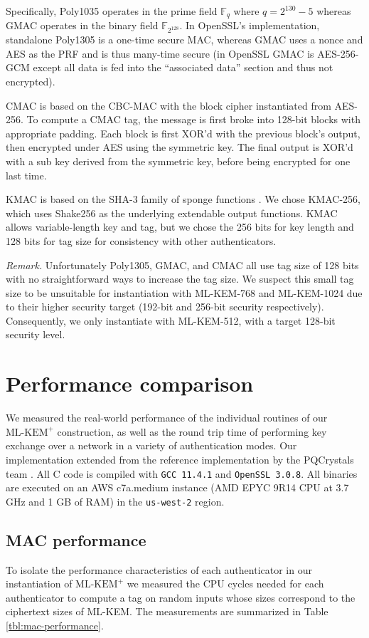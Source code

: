 \documentclass[journal=tches,submission]{iacrtrans}
\def\mlkemplus{\text{ML-KEM}^+}
\begin{document}
Specifically, Poly1035 operates in the prime field $\mathbb{F}_q$ where $q = 2^{130} - 5$ whereas GMAC operates in the binary field $\mathbb{F}_{2^{128}}$. In OpenSSL's implementation, standalone Poly1305 is a one-time secure MAC, whereas GMAC uses a nonce and AES as the PRF and is thus many-time secure (in OpenSSL GMAC is AES-256-GCM except all data is fed into the ``associated data'' section and thus not encrypted).

CMAC is based on the CBC-MAC with the block cipher instantiated from AES-256. To compute a CMAC tag, the message is first broke into 128-bit blocks with appropriate padding. Each block is first XOR'd with the previous block's output, then encrypted under AES using the symmetric key. The final output is XOR'd with a sub key derived from the symmetric key, before being encrypted for one last time.

KMAC is based on the SHA-3 family of sponge functions \cite{FIPS202}. We chose KMAC-256, which uses Shake256 as the underlying extendable output functions. KMAC allows variable-length key and tag, but we chose the 256 bits for key length and 128 bits for tag size for consistency with other authenticators.

\emph{Remark.} Unfortunately Poly1305, GMAC, and CMAC all use tag size of 128 bits with no straightforward ways to increase the tag size. We suspect this small tag size to be unsuitable for instantiation with ML-KEM-768 and ML-KEM-1024 due to their higher security target (192-bit and 256-bit security respectively). Consequently, we only instantiate with ML-KEM-512, with a target 128-bit security level.

\section{Performance comparison}\label{sec:performance-comparison}
We measured the real-world performance of the individual routines of our $\mlkemplus$ construction, as well as the round trip time of performing key exchange over a network in a variety of authentication modes. Our implementation extended from the reference implementation by the PQCrystals team \cite{kyberrefimpl}. All C code is compiled with \texttt{GCC 11.4.1} and \texttt{OpenSSL 3.0.8}. All binaries are executed on an AWS c7a.medium instance (AMD EPYC 9R14 CPU at 3.7 GHz and 1 GB of RAM) in the \texttt{us-west-2} region.

\subsection{MAC performance}
To isolate the performance characteristics of each authenticator in our instantiation of $\mlkemplus$ we measured the CPU cycles needed for each authenticator to compute a tag on random inputs whose sizes correspond to the ciphertext sizes of ML-KEM. The measurements are summarized in Table \ref{tbl:mac-performance}.
\end{document}
